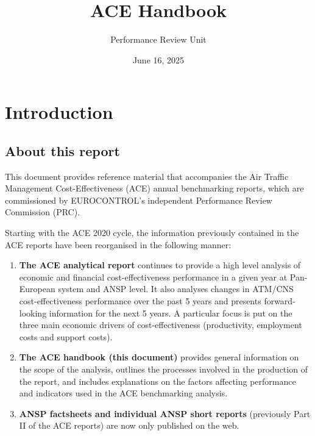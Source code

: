 \documentclass[
  11pt,
  a4paperpaper,
  openany,headsepline=on,footsepline=off,DIV=12,table]{scrbook}
\title{ACE Handbook}
\author{Performance Review Unit}
\date{June 16, 2025}
\renewcommand*\contentsname{Table of contents}
\newcommand\contentsname{Table of contents}
\begin{document}
\frontmatter
\maketitle

\renewcommand*\contentsname{Table of contents}
{
\hypersetup{linkcolor=blue}
\setcounter{tocdepth}{2}
\tableofcontents
}

\mainmatter
{}

\chapter{Introduction}\label{introduction}

\section{About this report}\label{about-this-report}

This document provides reference material that accompanies the Air
Traffic Management Cost-Effectiveness (ACE) annual benchmarking reports,
which are commissioned by EUROCONTROL's independent Performance Review
Commission (PRC).

Starting with the ACE 2020 cycle, the information previously contained
in the ACE reports have been reorganised in the following manner:

\begin{enumerate}
\def\labelenumi{\arabic{enumi}.}
\item
  \textbf{The ACE analytical report} continues to provide a high level
  analysis of economic and financial cost-effectiveness performance in a
  given year at Pan-European system and ANSP level. It also analyses
  changes in ATM/CNS cost-effectiveness performance over the past 5
  years and presents forward-looking information for the next 5 years. A
  particular focus is put on the three main economic drivers of
  cost-effectiveness (productivity, employment costs and support costs).
\item
  \textbf{The ACE handbook (this document)} provides general information
  on the scope of the analysis, outlines the processes involved in the
  production of the report, and includes explanations on the factors
  affecting performance and indicators used in the ACE benchmarking
  analysis.
\item
  \textbf{ANSP factsheets and individual ANSP short reports} (previously
  Part II of the ACE reports) are now only published on the web.
\end{enumerate}
\end{document}
